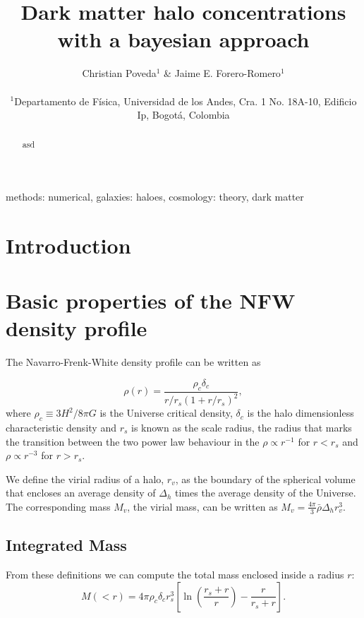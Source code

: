 \documentclass[useAMS,usenatbib]{mn2e}
\begin{document}
\title[Bayesian halo concentrations]{Dark matter halo
  concentrations with a bayesian approach}
\author[Poveda \& Forero-Romero]{
\parbox[t]{\textwidth}{\raggedright
  Christian Poveda$^{1}$ \&
  Jaime E. Forero-Romero$^{1}$
}
\vspace*{6pt}\\
$^{1}$Departamento de F\'{i}sica, Universidad de los Andes, Cra. 1
No. 18A-10, Edificio Ip, Bogot\'a, Colombia\\
}
\maketitle

\begin{abstract}
asd
\end{abstract}
\begin{keywords}
methods: numerical, galaxies: haloes, cosmology: theory, dark
matter
\end{keywords}


\section{Introduction}
\label{sec:introduction}


\citep{NFW}


\section{Basic properties of the NFW density profile}
\label{sec:basics}

The Navarro-Frenk-White density profile can be written as

\begin{equation}
\rho(r) = \frac{\rho_c\delta_c}{r/r_s(1+r/r_s)^2}, 
\end{equation}
%
where $\rho_c\equiv 3H^2/8\pi G$ is the Universe critical density,
$\delta_c$ is the halo dimensionless characteristic density and $r_s$
is known as the scale radius, the radius that marks the transition
between the two power law behaviour in the $\rho\propto r^{-1}$ for
$r<r_s$ and $\rho\propto r^{-3}$ for  $r>r_s$.  

We define the virial radius of a halo, $r_v$, as the boundary of the
spherical volume that encloses an average density of $\Delta_h$ times
the average density of the Universe. The corresponding mass $M_{v}$,
the virial mass, can be written as $M_{v} =
\frac{4\pi}{3}\bar{\rho}\Delta_h r_v^3$. 


\subsection{Integrated Mass}
From these definitions we can compute the total mass enclosed inside a
radius $r$:
\begin{equation}
M(<r) = 4\pi\rho_c\delta_c  r_s^3\left[\ln \left
  (\frac{r_s+r}{r}\right) - \frac{r}{r_s+r}\right].
\end{equation}
 
\end{document}
